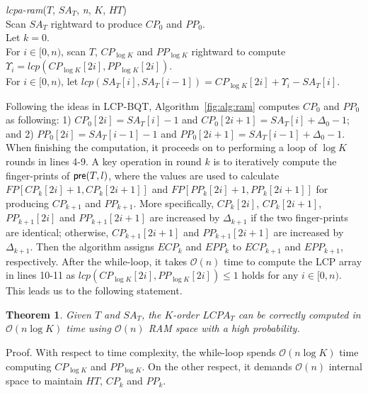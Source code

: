 \documentclass{llncs}
\newtheorem{thm}{Theorem}
\begin{document}
\begin{algorithm}[hbtp!]
\caption{Compute $K$-Order $LCPA_T$ in RAM}
\label{fig:alg:ram}
{\em lcpa-ram}($T$, $SA_T$, {\em n}, $K$, $HT$){\\
\SetAlgoNoLine
Scan $SA_T$ rightward to produce $CP_0$ and $PP_0$. \\
Let $k = 0$. \\
\While{$k < \log K$}{
\Indentp{-1em}
Radix-sort $CP_k$ and $PP_k$ to produce $ICP_k$ and $IPP_k$. \\
For $i\in [0,n)$, scan $T$ rightward to compute the finger-print of ${\sf pre}(T,i)$ and let $FP[0,i]=HT[i]$ if $i\in \{ICP_k[j] \cup IPP_k[j], j\in[0,2n)\}$. \\
For $i\in [0,n)$, scan $CP_k$ and $PP_k$ rightward to compute and compare $FP[CP_k[2i]+1,CP_k[2i+1]]$ and $FP[PP_k[2i]+1,PP_k[2i+1]]$ for generating $CP_{k+1}$ and $PP_{k+1}$. \\
Let $k = k +1$ and clear $HT$. \\
}
For $i\in [0,n)$, scan $T$, $CP_{\log K}$ and $PP_{\log K}$ rightward to compute $\Upsilon_i = lcp(CP_{\log K}[2i],PP_{\log K}[2i])$. \\
For $i\in [0,n)$, let $lcp(SA_T[i],SA_T[i-1])=CP_{\log K}[2i] +\Upsilon_i-SA_T[i]$. \\
}
\end{algorithm}

Following the ideas in {LCP-BQT}, Algorithm~\ref{fig:alg:ram} computes $CP_0$ and $PP_0$ as following: 1) $CP_0[2i]=SA_T[i]-1$ and $CP_0[2i+1]=SA_T[i]+ \Delta_0 - 1$; and 2) $PP_0[2i]=SA_T[i-1]-1$ and $PP_0[2i+1]=SA_T[i-1]+ \Delta_0 - 1$. When finishing the computation, it proceeds on to performing a loop of $\log K$ rounds in lines 4-9. A key operation in round $k$ is to iteratively compute the finger-prints of ${\sf pre}(T,l)$, where the values are used to calculate $FP[CP_k[2i]+1,CP_k[2i+1]]$ and $FP[PP_k[2i]+1,PP_k[2i+1]]$ for producing $CP_{k+1}$ and $PP_{k+1}$. More specifically, $CP_{k}[2i]$, $CP_{k}[2i+1]$, $PP_{k+1}[2i]$ and $PP_{k+1}[2i+1]$ are increased by $\Delta_{k+1}$ if the two finger-prints are identical; otherwise, $CP_{k+1}[2i+1]$ and $PP_{k+1}[2i+1]$ are increased by $\Delta_{k+1}$. Then the algorithm assigns $ECP_k$ and $EPP_k$ to $ECP_{k+1}$ and $EPP_{k+1}$, respectively. After the while-loop, it takes $\mathcal{O}(n)$ time to compute the {LCP} array in lines 10-11 as $lcp(CP_{\log K}[2i],PP_{\log K}[2i]) \le 1$ holds for any $i \in [0,n)$. This leads us to the following statement.

\begin{thm}
\label{thm:lcp:ram}
Given $T$ and $SA_T$, the $K$-order $LCPA_T$ can be correctly computed in $\mathcal{O}(n\log K)$ time using $\mathcal{O}(n)$ {RAM} space with a high probability.
\end{thm}
Proof. With respect to time complexity, the while-loop spends $\mathcal{O}(n\log K)$ time computing $CP_{\log K}$ and $PP_{\log K}$. On the other respect, it demands $\mathcal{O}(n)$ internal space to maintain $HT$, $CP_k$ and $PP_k$.
\end{document}
